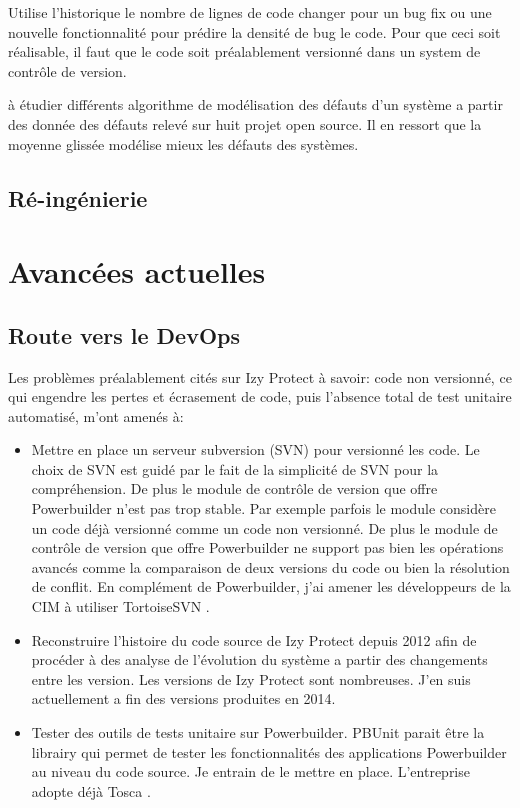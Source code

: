 \documentclass[a4paper]{article}
\begin{document}
\cite{naga05} Utilise l'historique le nombre de lignes de code changer pour un bug fix ou une nouvelle fonctionnalité pour prédire la densité de bug  le code. Pour que ceci soit réalisable, il faut que le code soit préalablement versionné dans un system de contrôle de version.

\cite{Raja09} à étudier différents algorithme de modélisation des défauts d'un système a partir des donnée des défauts relevé sur huit projet open source. Il en ressort que la moyenne glissée modélise mieux les défauts des systèmes.

 
\subsection{Ré-ingénierie}
\label{sec:reingenierie}


\section{Avancées actuelles}
\subsection{Route vers le DevOps}
\label{sec: devOps}
Les problèmes préalablement cités sur Izy Protect à savoir: code non versionné, ce qui engendre les pertes et écrasement de code, puis l'absence total de test unitaire automatisé, m'ont amenés à:
\begin{itemize}
\item Mettre en place un serveur subversion (SVN) pour versionné les code. 
Le choix de SVN est guidé par le fait  de la simplicité de SVN  pour la compréhension.  De plus le module de contrôle de version que offre Powerbuilder n'est pas trop stable. Par exemple parfois le module considère un code déjà versionné comme un code non versionné. De plus le module de contrôle de version que offre Powerbuilder ne support pas bien les opérations avancés comme la comparaison de deux versions du code ou bien la résolution de conflit. En complément de Powerbuilder,  j'ai amener les développeurs de la CIM à utiliser TortoiseSVN \cite{tort}.
\item Reconstruire l'histoire du code source de Izy Protect depuis 2012 afin de procéder à des analyse de l'évolution du système a partir des changements entre les version. Les versions de Izy Protect sont nombreuses. J'en suis actuellement a fin des versions produites en 2014.
\item Tester  des outils de tests unitaire sur Powerbuilder. PBUnit parait être la librairy qui permet de tester  les fonctionnalités des applications Powerbuilder au niveau du code source. 
Je entrain de le mettre en place.
 L'entreprise adopte déjà Tosca . 
\end{itemize}
\end{document}
